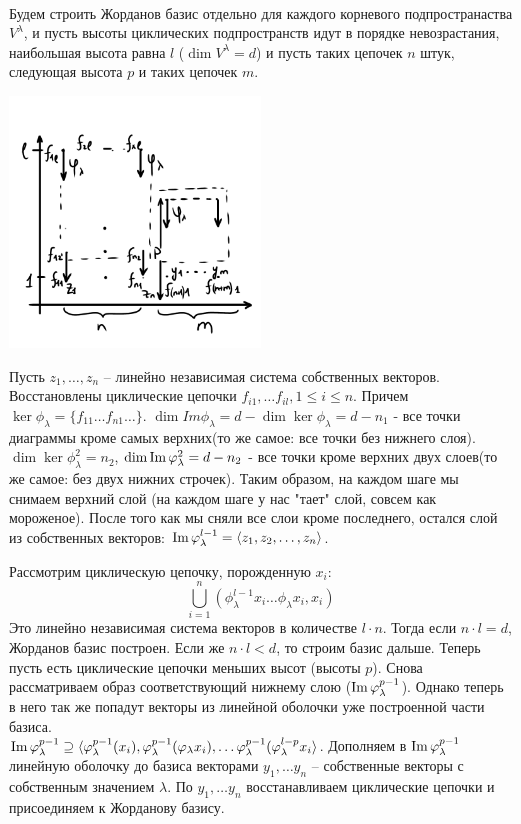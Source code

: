\begin{algorithm}~

Будем строить Жорданов базис отдельно для каждого корневого подпространаства $V^{\lambda}$, и пусть высоты циклических подпространств идут в порядке невозрастания, наибольшая высота равна $l$ ($\dim V^{\lambda} = d$) и пусть таких цепочек $n$ штук, следующая высота $p$ и таких цепочек $m$. \\
    \begin{center}
        \includegraphics[width = 0.5\textwidth]{images/lec6_4.PNG}
    \end{center}
Пусть $z_1, \dots, z_n$ -- линейно независимая система собственных векторов. Восстановлены циклические цепочки $f_{i1}, \dots f_{il}, 1 \leq i \leq n$. Причем $\ker \phi_{\lambda} = \{ f_{11} \dots f_{n1} \dots \}$.
$\dim Im \phi_{\lambda} = d - \dim \ker \phi_{\lambda} = d - n_1$ - все точки диаграммы кроме самых верхних(то же самое: все точки без нижнего слоя).
$\dim \ker \phi_{\lambda}^2 = n_2$, $\dim \operatorname{Im} \varphi_{\lambda}^2 = d - n_2$ - все точки кроме верхних двух слоев(то же самое: без двух нижних строчек).
Таким образом, на каждом шаге мы снимаем верхний слой (на каждом шаге у нас "тает" слой, совсем как мороженое).
После того как мы сняли все слои кроме последнего, остался слой из собственных векторов:
$\operatorname{Im} \varphi_{\lambda}^{l-1} = \langle z_1, z_2, \dots, z_n\rangle$.

Рассмотрим циклическую цепочку, порожденную $x_i$:
$$\bigcup\limits_{i = 1}^n (\phi_{\lambda}^{l - 1} x_i \dots \phi_{\lambda} x_i, x_i)$$
Это линейно независимая система векторов в количестве $l \cdot n$. Тогда если $n \cdot l = d$, Жорданов базис построен. Если же $n \cdot l < d$, то строим базис дальше. Теперь пусть есть циклические цепочки меньших высот (высоты $p$). 
Снова рассматриваем образ соответствующий нижнему слою ($\operatorname{Im} \varphi_{\lambda}^{p -1 }$). 
Однако теперь в него так же попадут векторы из линейной оболочки уже построенной части базиса.\\
$\operatorname{Im} \varphi_{\lambda}^{p - 1} \supseteq \langle \varphi_{\lambda}^{p - 1}(x_i), \varphi_{\lambda}^{p - 1}(\varphi_{\lambda} x_i), \dots \varphi_{\lambda}^{p - 1}(\varphi_{\lambda}^{l - p} x_i \rangle$. Дополняем в $\operatorname{Im} \varphi_{\lambda}^{p -1}$ линейную оболочку до базиса векторами $y_1, \dots y_n$ -- собственные векторы с собственным значением $\lambda$. По $y_1, \dots y_n$ восстанавливаем циклические цепочки и присоединяем к Жорданову базису.
\end{algorithm}

